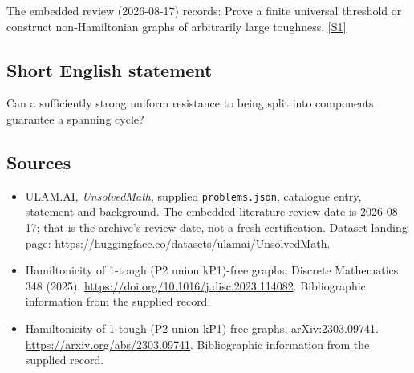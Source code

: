 \documentclass[11pt,a4paper]{article}
\newcommand{\sref}[2]{\hyperlink{source:#1:#2}{[S#2]}}
\begin{document}
The embedded review (2026-08-17) records: Prove a finite universal threshold or construct non-Hamiltonian graphs of arbitrarily large toughness. \sref{statement}{1}

\subsection{Short English statement}

Can a sufficiently strong uniform resistance to being split into components guarantee a spanning cycle?

\subsection{Sources}

{\small

\begin{itemize}

\item[\hypertarget{source:statement:1}{S1}] ULAM.AI, \emph{UnsolvedMath}, supplied \texttt{problems.json}, catalogue entry, statement and background. The embedded literature-review date is 2026-08-17; that is the archive’s review date, not a fresh certification. Dataset landing page: \url{https://huggingface.co/datasets/ulamai/UnsolvedMath}.

\item[\hypertarget{source:statement:2}{S2}] Hamiltonicity of 1-tough (P2 union kP1)-free graphs, Discrete Mathematics 348 (2025). \url{https://doi.org/10.1016/j.disc.2023.114082}. Bibliographic information from the supplied record.

\item[\hypertarget{source:statement:3}{S3}] Hamiltonicity of 1-tough (P2 union kP1)-free graphs, arXiv:2303.09741. \url{https://arxiv.org/abs/2303.09741}. Bibliographic information from the supplied record.

\end{itemize}

}

\label{end:statement}
\end{document}
